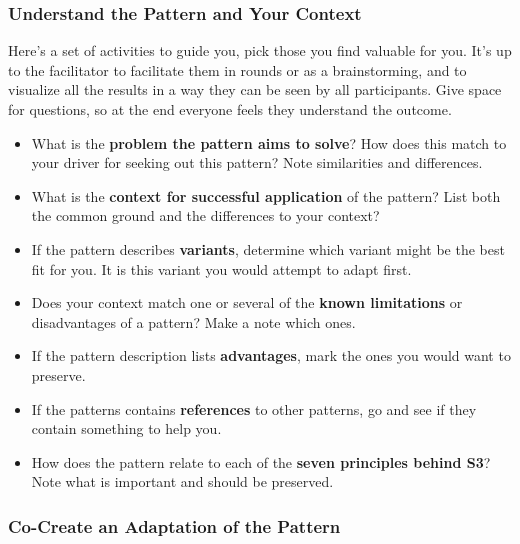 \subsubsection{Understand the Pattern and Your Context}
\label{understandthepatternandyourcontext}

Here's a set of activities to guide you, pick those you find valuable for you. It's up to the facilitator to facilitate them in rounds or as a brainstorming, and to visualize all the results in a way they can be seen by all participants. Give space for questions, so at the end everyone feels they understand the outcome.

\begin{itemize}
\item What is the \textbf{problem the pattern aims to solve}? How does this match to your driver for seeking out this pattern? Note similarities and differences.

\item What is the \textbf{context for successful application} of the pattern? List both the common ground and the differences to your context?

\item If the pattern describes \textbf{variants}, determine which variant might be the best fit for you. It is this variant you would attempt to adapt first.

\item Does your context match one or several of the \textbf{known limitations} or disadvantages of a pattern? Make a note which ones.

\item If the pattern description lists \textbf{advantages}, mark the ones you would want to preserve.

\item If the patterns contains \textbf{references} to other patterns, go and see if they contain something to help you.

\item How does the pattern relate to each of the \textbf{seven principles behind S3}? Note what is important and should be preserved.

\end{itemize}

\subsubsection{Co-Create an Adaptation of the Pattern}
\label{co-createanadaptationofthepattern}

